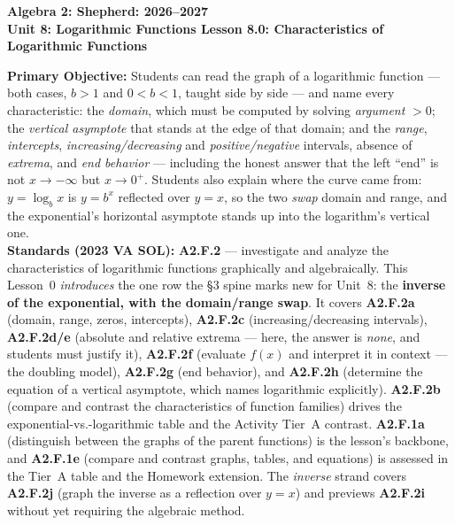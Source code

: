 \documentclass[10pt]{article}
\newcommand{\CourseName}{Algebra 2: Shepherd}
\newcommand{\SchoolYear}{2026--2027}
\newcommand{\UnitNumberName}{Unit 8: Logarithmic Functions \quad}
\newcommand{\LessonNumberName}{Lesson 8.0: Characteristics of Logarithmic Functions}
\begin{document}
\begin{center}
    {\Large\bfseries \CourseName: \SchoolYear \\
    {\small\bfseries \UnitNumberName \LessonNumberName}}
\end{center}

\begin{tcolorbox}[colback=forestbg, colframe=forest, boxrule=0.9pt, arc=2mm,
    left=2mm, right=2mm, top=1.5mm, bottom=1.5mm]
    \textbf{Primary Objective:} Students can read the graph of a logarithmic function --- both cases,
    $b>1$ and $0<b<1$, taught side by side --- and name every characteristic: the \emph{domain},
    which must be computed by solving \emph{argument} $>0$; the \emph{vertical asymptote} that stands
    at the edge of that domain; and the \emph{range}, \emph{intercepts},
    \emph{increasing/decreasing} and \emph{positive/negative} intervals, absence of \emph{extrema},
    and \emph{end behavior} --- including the honest answer that the left ``end'' is not
    $x\to-\infty$ but $x\to 0^{+}$. Students also explain where the curve came from: $y=\log_b x$ is
    $y=b^x$ reflected over $y=x$, so the two \emph{swap} domain and range, and the exponential's
    horizontal asymptote stands up into the logarithm's vertical one.
    \\[2pt]
    \textbf{Standards (2023 VA SOL):} \textbf{A2.F.2} --- investigate and analyze the characteristics
    of logarithmic functions graphically and algebraically. This Lesson~0 \emph{introduces} the one
    row the \S3 spine marks new for Unit~8: the \textbf{inverse of the exponential, with the
    domain/range swap}. It covers \textbf{A2.F.2a} (domain, range, zeros, intercepts),
    \textbf{A2.F.2c} (increasing/decreasing intervals), \textbf{A2.F.2d/e} (absolute and relative
    extrema --- here, the answer is \emph{none}, and students must justify it), \textbf{A2.F.2f}
    (evaluate $f(x)$ and interpret it in context --- the doubling model), \textbf{A2.F.2g} (end
    behavior), and \textbf{A2.F.2h} (determine the equation of a vertical asymptote, which names
    logarithmic explicitly). \textbf{A2.F.2b} (compare and contrast the characteristics of function
    families) drives the exponential-vs.-logarithmic table and the Activity Tier~A contrast.
    \textbf{A2.F.1a} (distinguish between the graphs of the parent functions) is the lesson's
    backbone, and \textbf{A2.F.1e} (compare and contrast graphs, tables, and equations) is assessed
    in the Tier~A table and the Homework extension. The \emph{inverse} strand covers
    \textbf{A2.F.2j} (graph the inverse as a reflection over $y=x$) and previews \textbf{A2.F.2i}
    without yet requiring the algebraic method.
\end{tcolorbox}
\end{document}
